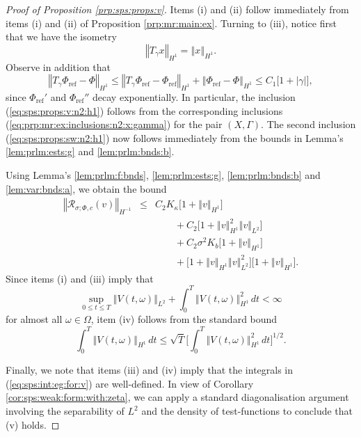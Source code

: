 \documentclass[10pt]{articleHJ}
\newcommand{\abs}[1]{\left\vert#1\right\vert}			%
\newcommand{\norm}[1]{\left\Vert#1\right\Vert}		%
\newcommand{\sref}[1]{(\ref{#1})}                       %
\numberwithin{equation}{section}
\begin{document}
\begin{proof}[Proof of Proposition \ref{prp:sps:props:v}]
Items (i) and (ii) follow immediately
from items (i) and (ii) of Proposition \ref{prp:mr:main:ex}.
Turning to (iii), notice first that we have the isometry
\begin{equation}
\norm{ T_{\gamma} x }_{H^1} = \norm{x}_{H^1}.
\end{equation}
Observe in addition that
\begin{equation}
\norm{ T_{\gamma} \Phi_{\mathrm{ref}} - \Phi }_{H^1}
\le
  \norm{ T_{\gamma} \Phi_{\mathrm{ref}} - \Phi_{\mathrm{ref}} }_{H^1}
   + \norm{\Phi_{\mathrm{ref}} - \Phi}_{H^1}
\le
C_1 \big[ 1 + \abs{\gamma} \big],
\end{equation}
since $\Phi_{\mathrm{ref}}'$ and $\Phi_{\mathrm{ref}}''$
decay exponentially.
In particular,
the inclusion \sref{eq:sps:props:v:n2:h1}
follows from the corresponding
inclusions \sref{eq:prp:mr:ex:inclusions:n2:x:gamma}
for the pair $(X, \Gamma)$.
The second inclusion \sref{eq:sps:props:sw:n2:h1}
now follows immediately from
the bounds in Lemma's \ref{lem:prlm:ests:g}
and \ref{lem:prlm:bnds:b}.

Using Lemma's \ref{lem:prlm:f:bnds},
\ref{lem:prlm:ests:g},
\ref{lem:prlm:bnds:b}
and \ref{lem:var:bnds:a},
we obtain the bound
\begin{equation}
\label{eq:sps:bnd:comp:on:r:sigma}
\begin{array}{lcl}
\norm{ \mathcal{R}_{\sigma;\Phi,c}(v) }_{H^{-1}}
& \le &
  C_2 K_{\kappa} \big[ 1 + \norm{v}_{H^1} \big]
\\[0.2cm]
& & \qquad
+ C_2 \big[ 1 + \norm{v}_{H^1}^2 \norm{v}_{L^2} \big]
\\[0.2cm]
& & \qquad
+ C_2 \sigma^2 K_b \big[ 1 + \norm{v}_{H^1} \big]
\\[0.2cm]
& & \qquad
 + \big[ 1 + \norm{v}_{H^1} \norm{v}_{L^2}^2 \big]
   \big[ 1 + \norm{v}_{H^1} \big].
\end{array}
\end{equation}
Since items (i) and (iii) imply that
\begin{equation}
\sup_{0 \le t \le T} \norm{V(t, \omega)}_{L^2}
+ \int_0^T \norm{V(t, \omega)}_{H^1}^2 \, d t
< \infty
\end{equation}
for almost all $\omega \in \Omega$,
item (iv) follows from the standard
bound
\begin{equation}
\int_0^T
  \norm{V(t, \omega)}_{H^1} \, dt
\le \sqrt{T} \Big[\int_0^T
  \norm{V(t, \omega)}^2_{H^1} \, dt \Big]^{1/2}.
\end{equation}

Finally, we note that items (iii) and (iv)
imply that the integrals in
\sref{eq:sps:int:eg:for:v} are well-defined.
In view of Corollary
\ref{cor:sps:weak:form:with:zeta},
we can apply
a standard diagonalisation argument
involving the separability of $L^2$
and the density of test-functions
to conclude that (v) holds.
\end{proof}
\end{document}

